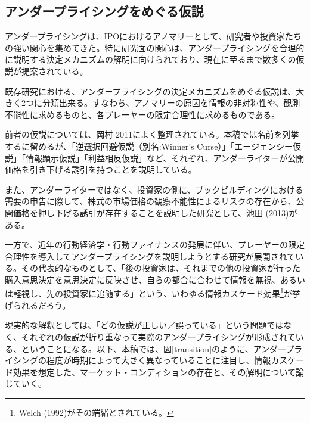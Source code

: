 \documentclass{jsarticle}
\begin{document}
\subsection{アンダープライシングをめぐる仮説}
アンダープライシングは、IPOにおけるアノマリーとして、研究者や投資家たちの強い関心を集めてきた。特に研究面の関心は、アンダープライシングを合理的に説明する決定メカニズムの解明に向けられており、現在に至るまで数多くの仮説が提案されている。\par
既存研究における、アンダープライシングの決定メカニズムをめぐる仮説は、大きく2つに分類出来る。すなわち、アノマリーの原因を情報の非対称性や、観測不能性に求めるものと、各プレーヤーの限定合理性に求めるものである。\\ \par
前者の仮説については、岡村 2011\cite{okamura}によく整理されている。本稿では名前を列挙するに留めるが、「逆選択回避仮説（別名:Winner's Curse）」「エージェンシー仮説」「情報顕示仮説」「利益相反仮説」など、それぞれ、アンダーライターが公開価格を引き下げる誘引を持つことを説明している。\par

また、アンダーライターではなく、投資家の側に、ブックビルディングにおける需要の申告に際して、株式の市場価格の観察不能性によるリスクの存在から、公開価格を押し下げる誘引が存在することを説明した研究として、池田 (2013)\cite{ikeda}がある。\\ \par

一方で、近年の行動経済学・行動ファイナンスの発展に伴い、プレーヤーの限定合理性を導入してアンダープライシングを説明しようとする研究が展開されている。その代表的なものとして、「後の投資家は、それまでの他の投資家が行った購入意思決定を意思決定に反映させ、自らの都合に合わせて情報を無視、あるいは軽視し、先の投資家に追随する」という、いわゆる情報カスケード効果\footnote[8]{Welch (1992)\cite{Welch}がその端緒とされている。}が挙げられるだろう。\\ \par



現実的な解釈としては、「どの仮説が正しい／誤っている」という問題ではなく、それぞれの仮説が折り重なって実際のアンダープライシングが形成されている、ということになる。以下、本稿では、図\ref{transition}のように、アンダープライシングの程度が時期によって大きく異なっていることに注目し、情報カスケード効果を想定した、マーケット・コンディションの存在と、その解明について論じていく。
\end{document}
